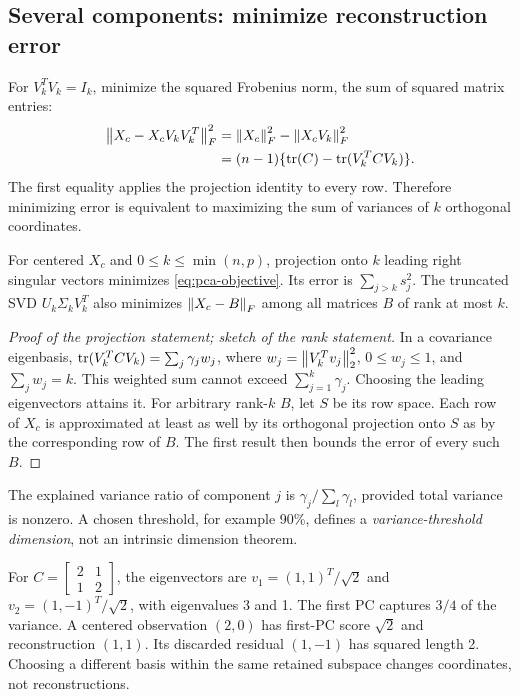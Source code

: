 \subsection{Several components: minimize reconstruction error}
For $V_k^TV_k=I_k$, minimize the squared Frobenius norm, the sum of squared matrix entries:
\begin{align}
\left\lVert X_c-X_cV_kV_k^T\right\rVert_F^2
&=\left\lVert X_c\right\rVert_F^2-\left\lVert X_cV_k\right\rVert_F^2\\
&=(n-1)\{\operatorname{tr}(C)-\operatorname{tr}(V_k^TCV_k)\}.\label{eq:pca-objective}
\end{align}
The first equality applies the projection identity to every row. Therefore minimizing error is equivalent to maximizing the sum of variances of $k$ orthogonal coordinates.

\begin{theorem}\label{thm:pca}
For centered $X_c$ and $0\leq k\leq\min(n,p)$, projection onto $k$ leading right singular vectors minimizes \eqref{eq:pca-objective}. Its error is $\sum_{j>k}s_j^2$. The truncated SVD $U_k\Sigma_kV_k^T$ also minimizes $\left\lVert X_c-B\right\rVert_F$ among all matrices $B$ of rank at most $k$.
\end{theorem}
\begin{proof}[Proof of the projection statement; sketch of the rank statement]
In a covariance eigenbasis, $\operatorname{tr}(V_k^TCV_k)=\sum_j\gamma_jw_j$, where $w_j=\left\lVert V_k^Tv_j\right\rVert_2^2$, $0\leq w_j\leq1$, and $\sum_jw_j=k$. This weighted sum cannot exceed $\sum_{j=1}^k\gamma_j$. Choosing the leading eigenvectors attains it. For arbitrary rank-$k$ $B$, let $S$ be its row space. Each row of $X_c$ is approximated at least as well by its orthogonal projection onto $S$ as by the corresponding row of $B$. The first result then bounds the error of every such $B$.
\end{proof}

The explained variance ratio of component $j$ is $\gamma_j/\sum_l\gamma_l$, provided total variance is nonzero. A chosen threshold, for example 90\%, defines a \emph{variance-threshold dimension}, not an intrinsic dimension theorem.

\begin{example}
For $C=\left[\begin{smallmatrix}2&1\\1&2\end{smallmatrix}\right]$, the eigenvectors are $v_1=(1,1)^T/\sqrt2$ and $v_2=(1,-1)^T/\sqrt2$, with eigenvalues 3 and 1. The first PC captures $3/4$ of the variance. A centered observation $(2,0)$ has first-PC score $\sqrt2$ and reconstruction $(1,1)$. Its discarded residual $(1,-1)$ has squared length 2. Choosing a different basis within the same retained subspace changes coordinates, not reconstructions.
\end{example}

